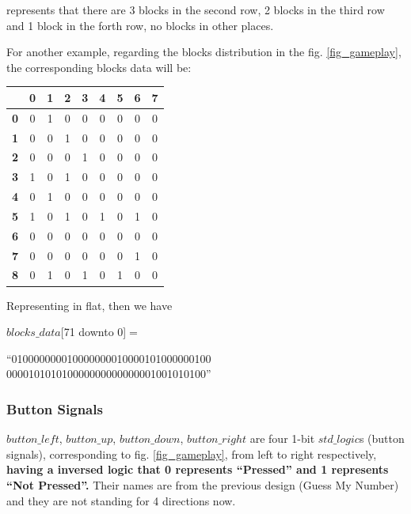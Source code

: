 \documentclass[conference]{IEEEtran}
\begin{document}
represents that there are 3 blocks in the second row, 2 blocks in the third row and 1 block in the forth row, no blocks in other places.

For another example, regarding the blocks distribution in the fig. \ref{fig_gameplay}, the corresponding blocks data will be: 

\begin{center}
\begin{tabular}{c|c|c|c|c|c|c|c|c}
        & \textbf{0} & \textbf{1} & \textbf{2} & 
        \textbf{3} & \textbf{4} & \textbf{5} &
        \textbf{6} & \textbf{7} \\ 
    \hline
    \textbf{0} & 0 & 1 & 0 & 0 & 0 & 0 & 0 & 0 \\
    \hline
    \textbf{1} & 0 & 0 & 1 & 0 & 0 & 0 & 0 & 0 \\
    \hline
    \textbf{2} & 0 & 0 & 0 & 1 & 0 & 0 & 0 & 0 \\
    \hline
    \textbf{3} & 1 & 0 & 1 & 0 & 0 & 0 & 0 & 0 \\
    \hline
    \textbf{4} & 0 & 1 & 0 & 0 & 0 & 0 & 0 & 0 \\
    \hline
    \textbf{5} & 1 & 0 & 1 & 0 & 1 & 0 & 1 & 0 \\
    \hline
    \textbf{6} & 0 & 0 & 0 & 0 & 0 & 0 & 0 & 0 \\
    \hline
    \textbf{7} & 0 & 0 & 0 & 0 & 0 & 0 & 1 & 0 \\
    \hline
    \textbf{8} & 0 & 1 & 0 & 1 & 0 & 1 & 0 & 0
\end{tabular}        
\end{center}

Representing in flat, then we have 

$blocks\_data$[71 downto 0]$=$ 

\begin{center}
    ``010000000010000000010000101000000100
     000010101010000000000000001001010100''
\end{center}

\subsubsection{Button Signals}
$button\_left$, $button\_up$, $button\_down$, $button\_right$ are four 1-bit $std\_logic$s (button signals), corresponding to fig. \ref{fig_gameplay},  from left to right  respectively, \textbf{having a inversed logic that 0 represents ``Pressed'' and 1 represents ``Not Pressed''.} Their names are from the previous design (Guess My Number) and they are not standing for 4 directions now.
\end{document}
